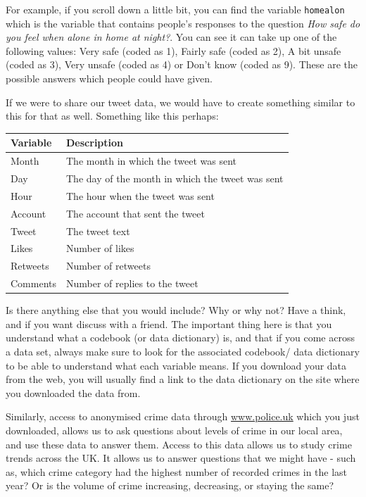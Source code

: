 \documentclass[
]{book}
\begin{document}
For example, if you scroll down a little bit, you can find the variable \texttt{homealon} which is the variable that contains people's responses to the question \emph{How safe do you feel when alone in home at night?}. You can see it can take up one of the following values: Very safe (coded as 1), Fairly safe (coded as 2), A bit unsafe (coded as 3), Very unsafe (coded as 4) or Don't know (coded as 9). These are the possible answers which people could have given.

If we were to share our tweet data, we would have to create something similar to this for that as well. Something like this perhaps:

\begin{tabular}{l|l}
\hline
Variable & Description\\
\hline
Month & The month in which the tweet was sent\\
\hline
Day & The day of the month in which the tweet was sent\\
\hline
Hour & The hour when the tweet was sent\\
\hline
Account & The account that sent the tweet\\
\hline
Tweet & The tweet text\\
\hline
Likes & Number of likes\\
\hline
Retweets & Number of retweets\\
\hline
Comments & Number of replies to the tweet\\
\hline
\end{tabular}

Is there anything else that you would include? Why or why not? Have a think, and if you want discuss with a friend. The important thing here is that you understand what a codebook (or data dictionary) is, and that if you come across a data set, always make sure to look for the associated codebook/ data dictionary to be able to understand what each variable means. If you download your data from the web, you will usually find a link to the data dictionary on the site where you downloaded the data from.

Similarly, access to anonymised crime data through \url{www.police.uk} which you just downloaded, allows us to ask questions about levels of crime in our local area, and use these data to answer them. Access to this data allows us to study crime trends across the UK. It allows us to answer questions that we might have - such as, which crime category had the highest number of recorded crimes in the last year? Or is the volume of crime increasing, decreasing, or staying the same?
\end{document}

